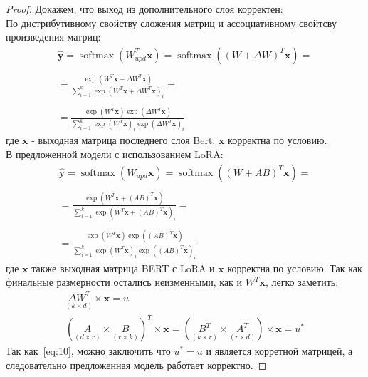 \begin{proof} 
Докажем, что выход из дополнительного слоя корректен:\\ По дистрибутивному свойству сложения матриц и ассоциативному свойтсву произведения матриц: 
\begin{equation}
\label{eq:9}
\begin{aligned}
\hat{\mathbf{y}} = \operatorname{softmax}\left(W_{upd}^T \mathbf{x}\right) =
\operatorname{softmax}\left((W + \Delta W)^T \mathbf{x}\right) =\\ \\
= \frac{\exp \left(W^T \mathbf{x} + \Delta W^T \mathbf{x}\right)}{\sum_{i=1}^k \exp \left(W^T \mathbf{x} + \Delta W^T \mathbf{x}\right)_i}=\\ \\
= \frac{\exp \left(W^T \mathbf{x}\right) \exp \left(\Delta W^T \mathbf{x}\right)}{\sum_{i=1}^k \exp \left(W^T \mathbf{x}\right)_i \exp \left(\Delta W^T \mathbf{x}\right)_i}
\end{aligned}
\end{equation} 
где $\mathbf{x}$ - выходная матрица последнего слоя Bert.
$\mathbf{x}$ корректна по условию.\\
В предложенной модели с использованием LoRA:
\begin{equation}
\label{eq:10}
\begin{aligned}
\hat{\mathbf{y}} = \operatorname{softmax}\left(W_{upd} \mathbf{x}\right) =
\operatorname{softmax}\left((W + AB)^T \mathbf{x}\right) =\\ \\
= \frac{\exp \left(W^T \mathbf{x} + (AB)^T \mathbf{x}\right)}{\sum_{i=1}^k \exp \left(W^T \mathbf{x} + (AB)^T \mathbf{x}\right)_i}=\\ \\
= \frac{\exp \left(W^T \mathbf{x}\right) \exp \left((AB)^T \mathbf{x}\right)}{\sum_{i=1}^k \exp \left(W^T \mathbf{x}\right)_i \exp \left((AB)^T \mathbf{x}\right)_i}
\end{aligned}
\end{equation} 
где $\mathbf{x}$ также выходная матрица BERT с LoRA и $\mathbf{x}$ корректна по условию. \newline
Так как финальные размерности остались неизменными, как и $W^T\mathbf{x}$, легко заметить: 
\begin{equation}
\label{eq:11}
\begin{aligned}
 \underset{(k \times d)}{\Delta W^T} \times \mathbf{x} = u\\
(\underset{(d \times r)}{A} \times \underset{(r \times k)}{B})^T \times \mathbf{x} = (\underset{(k \times r)}{B^T} \times \underset{(r \times d)}{A^T}) \times \mathbf{x} = u^*
\end{aligned}
\end{equation}
Так как~\eqref{eq:10}, можно заключить что ${u^*} = {u}$ и является корретной матрицей, а следовательно предложенная модель работает корректно.
\end{proof}
